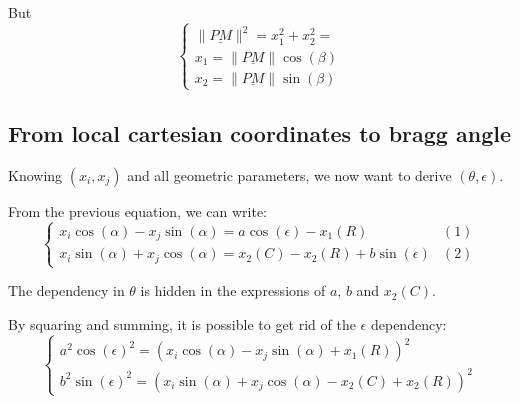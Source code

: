 \documentclass[a4paper,11pt,twoside,titlepage,openright]{book}
\numberwithin{equation}{section}
\newcommand{\ud}[1]{\underline{#1}}
\newcommand{\lt}{\left}
\newcommand{\rt}{\right}
\begin{document}
But
$$
\lt\{
	\begin{array}{lll}
		\|\ud{PM}\|^2 = x_1^2 + x_2^2 = \\
		x_1 = \|\ud{PM}\|\cos(\beta)\\
		x_2 = \|\ud{PM}\|\sin(\beta)
	\end{array}
\rt.
$$



\subsection{From local cartesian coordinates to bragg angle}

Knowing $(x_i, x_j)$ and all geometric parameters, we now want to derive $(\theta, \epsilon)$.

From the previous equation, we can write:
$$
\lt\{
	\begin{array}{lll}
        x_i\cos(\alpha) - x_j\sin(\alpha) = a\cos(\epsilon)-x_1(R) & (1)\\
        x_i\sin(\alpha) + x_j\cos(\alpha) = x_2(C)-x_2(R) + b\sin(\epsilon) &
        (2)
	\end{array}
\rt.
$$

The dependency in $\theta$ is hidden in the expressions of $a$, $b$ and
$x_2(C)$.

By squaring and summing, it is possible to get rid of the $\epsilon$
dependency:
$$
\lt\{
	\begin{array}{lll}
        a^2\cos(\epsilon)^2 = \lt(x_i\cos(\alpha) - x_j\sin(\alpha) +
        x_1(R)\rt)^2\\
        b^2\sin(\epsilon)^2 = \lt(x_i\sin(\alpha) + x_j\cos(\alpha) - x_2(C) +
        x_2(R)\rt)^2
	\end{array}
\rt.
$$
\end{document}
